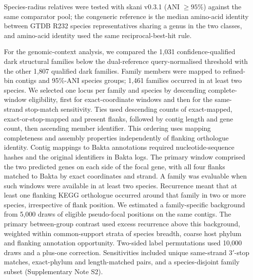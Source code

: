 Species-radius relatives were tested with skani v0.3.1 (ANI $\geq95\%$) against the same comparator pool; the congeneric reference is the median amino-acid identity between GTDB R232 species representatives sharing a genus in the two classes, and amino-acid identity used the same reciprocal-best-hit rule.

For the genomic-context analysis, we compared the 1{,}031 confidence-qualified dark structural
families below the dual-reference query-normalised threshold with the other 1{,}807 qualified
dark families. Family members were mapped to refined-bin contigs and 95\%-ANI species groups;
1{,}461 families occurred in at least two species. We selected one locus per family and species by descending complete-window eligibility, first
for exact-coordinate windows and then for the same-strand stop-match sensitivity. Ties used
descending counts of exact-mapped, exact-or-stop-mapped and present flanks, followed by contig
length and gene count, then ascending member identifier. This ordering uses mapping completeness
and assembly properties independently of flanking orthologue identity. Contig mappings to Bakta
annotations required nucleotide-sequence hashes and the original identifiers in Bakta logs.
The primary window comprised the two predicted genes on each side of the focal gene, with all
four flanks matched to Bakta by exact coordinates and strand. A family was evaluable when such
windows were available in at least two species. Recurrence meant that at least one flanking KEGG
orthologue occurred around that family in two or more species, irrespective of flank position.
We estimated a family-specific background from 5{,}000 draws of eligible pseudo-focal positions
on the same contigs. The primary between-group contrast used excess recurrence above this
background, weighted within common-support strata of species breadth, coarse host phylum and
flanking annotation opportunity. Two-sided label permutations used 10{,}000 draws and a plus-one
correction. Sensitivities included unique same-strand 3$'$-stop matches, exact-phylum and
length-matched pairs, and a species-disjoint family subset (Supplementary Note S2).

